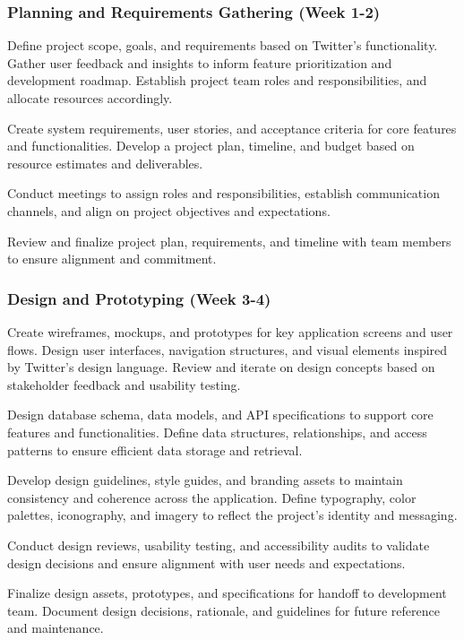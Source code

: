 \documentclass{article}
\begin{document}
\subsubsection{Planning and Requirements Gathering (Week 1-2)}
\begin{itemsize}
    \item Define project scope, goals, and requirements based on Twitter's functionality. Gather user feedback and insights to inform feature prioritization and development roadmap. Establish project team roles and responsibilities, and allocate resources accordingly.
    \item Create system requirements, user stories, and acceptance criteria for core features and functionalities. Develop a project plan, timeline, and budget based on resource estimates and deliverables.
    \item Conduct meetings to assign roles and responsibilities, establish communication channels, and align on project objectives and expectations.
    \item Review and finalize project plan, requirements, and timeline with team members to ensure alignment and commitment.
\end{itemsize}
\subsubsection{Design and Prototyping (Week 3-4)}
\begin{itemsize}
    \item Create wireframes, mockups, and prototypes for key application screens and user flows. Design user interfaces, navigation structures, and visual elements inspired by Twitter's design language. Review and iterate on design concepts based on stakeholder feedback and usability testing.
    \item Design database schema, data models, and API specifications to support core features and functionalities. Define data structures, relationships, and access patterns to ensure efficient data storage and retrieval.
    \item Develop design guidelines, style guides, and branding assets to maintain consistency and coherence across the application. Define typography, color palettes, iconography, and imagery to reflect the project's identity and messaging.
    \item Conduct design reviews, usability testing, and accessibility audits to validate design decisions and ensure alignment with user needs and expectations.
    \item Finalize design assets, prototypes, and specifications for handoff to development team. Document design decisions, rationale, and guidelines for future reference and maintenance.
\end{itemsize}
\end{document}
